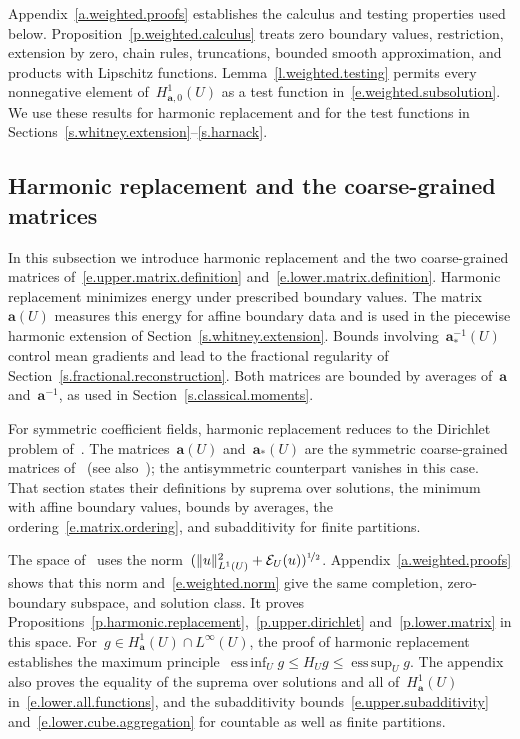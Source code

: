 \documentclass[11pt,letterpaper]{article}
\numberwithin{equation}{section}
\theoremstyle{definition}
\renewcommand{\a}{\mathbf{a}}
\newcommand{\nf}{\nicefrac}
\DeclareMathOperator*{\esssup}{ess\,sup}
\DeclareMathOperator*{\essinf}{ess\,inf}
\DeclarePairedDelimiter{\norm}{\lVert}{\rVert}
\newcommand{\Ener}{\mathcal E}
\newcommand{\Hzero}[1]{H^1_{#1,0}}
\begin{document}
\smallskip

Appendix~\ref{a.weighted.proofs} establishes the calculus and testing properties used below. Proposition~\ref{p.weighted.calculus} treats zero boundary values, restriction, extension by zero, chain rules, truncations, bounded smooth approximation, and products with Lipschitz functions. Lemma~\ref{l.weighted.testing} permits every nonnegative element of~$\Hzero{\a}(U)$ as a test function in~\eqref{e.weighted.subsolution}. We use these results for harmonic replacement and for the test functions in Sections~\ref{s.whitney.extension}--\ref{s.harnack}.

\subsection{Harmonic replacement and the coarse-grained matrices}

In this subsection we introduce harmonic replacement and the two coarse-grained matrices of~\eqref{e.upper.matrix.definition} and~\eqref{e.lower.matrix.definition}. Harmonic replacement minimizes energy under prescribed boundary values. The matrix~$\a(U)$ measures this energy for affine boundary data and is used in the piecewise harmonic extension of Section~\ref{s.whitney.extension}. Bounds involving~$\a_*^{-1}(U)$ control mean gradients and lead to the fractional regularity of Section~\ref{s.fractional.reconstruction}. Both matrices are bounded by averages of~$\a$ and~$\a^{-1}$, as used in Section~\ref{s.classical.moments}.

For symmetric coefficient fields, harmonic replacement reduces to the Dirichlet problem of~\cite[Section~2.1]{AK.HC}. The matrices~$\a(U)$ and~$\a_*(U)$ are the symmetric coarse-grained matrices of~\cite[Section~2.3]{AK.HC} (see also~\cite{AKM.Book}); the antisymmetric counterpart vanishes in this case. That section states their definitions by suprema over solutions, the minimum with affine boundary values, bounds by averages, the ordering~\eqref{e.matrix.ordering}, and subadditivity for finite partitions.

The space of~\cite[Section~2.1]{AK.HC} uses the norm~$(\norm{u}_{L^1(U)}^2+\Ener_U(u))^{\nf12}$. Appendix~\ref{a.weighted.proofs} shows that this norm and~\eqref{e.weighted.norm} give the same completion, zero-boundary subspace, and solution class. It proves Propositions~\ref{p.harmonic.replacement},~\ref{p.upper.dirichlet} and~\ref{p.lower.matrix} in this space. For~$g\in H^1_\a(U)\cap L^\infty(U)$, the proof of harmonic replacement establishes the maximum principle~$\essinf_Ug\leq H_Ug\leq\esssup_Ug$. The appendix also proves the equality of the suprema over solutions and all of~$H^1_\a(U)$ in~\eqref{e.lower.all.functions}, and the subadditivity bounds~\eqref{e.upper.subadditivity} and~\eqref{e.lower.cube.aggregation} for countable as well as finite partitions.
\end{document}
